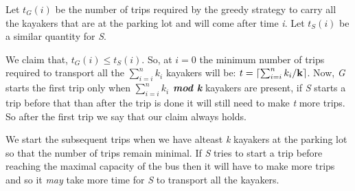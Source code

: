 \documentclass[8pt]{article}
\DeclarePairedDelimiter\ceil{\lceil}{\rceil}
\begin{document}
Let \textit{$t_G(i)$} be the number of trips required by the greedy strategy to carry all the kayakers that are at the parking lot and will come after time \textit{i}. Let \textit{$t_S(i)$} be a similar quantity for \textit{S}.

We claim that, \textit{$t_G(i) \leq t_S(i)$}. So, at $i=0$ the minimum number of trips required to transport all the \textit{$\sum_{i=i}^nk_i$} kayakers will be: \textit{$t=\ceil{\sum_{i=i}^nk_i/\textbf{k}}$}. Now, \textit{G} starts the first trip only when \textbf{\textit{$\sum_{i=i}^nk_i$ mod k}} kayakers are present,  if \textit{S} starts a trip before that than after the trip is done it will still need to make \textit{t} more trips. So after the first trip we say that our claim always holds.

We start the subsequent trips when we have alteast \textit{k} kayakers at the parking lot so that the number of trips remain minimal. If \textit{S} tries to start a trip before reaching the maximal capacity of the bus then it will have to make more trips and so it \textit{may} take more time for \textit{S} to transport all the kayakers.
\end{document}
